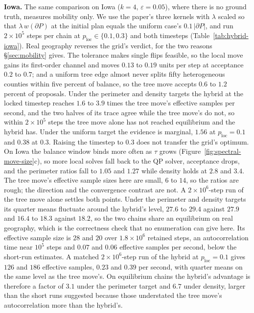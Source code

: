 \documentclass[11pt]{article}
\begin{document}
\textbf{Iowa.} The same comparison on Iowa ($k = 4$,
$\varepsilon = 0.05$), where there is no ground truth, measures
mobility only. We use the paper's three kernels with $\lambda$ scaled
so that $\lambda\,w(\partial P)$ at the initial plan equals the
uniform case's $0.1\,|\partial P|$, and run $2 \times 10^5$ steps per
chain at $p_{\mathrm{loc}} \in \{0.1, 0.3\}$ and both timesteps
(Table~\ref{tab:hybrid-iowa}). Real geography reverses the grid's
verdict, for the two reasons \S\ref{sec:mobility} gives. The
tolerance makes single flips feasible, so the local move gains its
first-order channel and moves $0.13$ to $0.19$ units per step at
acceptance $0.2$ to $0.7$; and a uniform tree edge almost never
splits fifty heterogeneous counties within five percent of balance,
so the tree move accepts $0.6$ to $1.2$ percent of proposals. Under
the perimeter and density targets the hybrid at the locked timestep
reaches $1.6$ to $3.9$ times the tree move's effective samples per
second, and the two halves of its trace agree while the tree move's
do not, so within $2 \times 10^5$ steps the tree move alone has not
reached equilibrium and the hybrid has. Under the uniform target the
evidence is marginal, $1.56$ at $p_{\mathrm{loc}} = 0.1$ and $0.38$
at $0.3$. Raising the timestep to $0.3$ does not transfer the grid's
optimum. On Iowa the balance window binds more often as $\tau$ grows
(Figure~\ref{fig:spectral-move-size}c), so more local solves fall
back to the QP solver, acceptance drops, and the perimeter ratios
fall to $1.05$ and $1.27$ while density holds at $2.8$ and $3.4$. The
tree move's effective sample sizes here are small, $6$ to $14$, so
the ratios are rough; the direction and the convergence contrast are
not. A $2 \times 10^6$-step run of the tree move alone settles both
points. Under the perimeter and density targets its quarter means
fluctuate around the hybrid's level, $27.6$ to $29.4$ against $27.9$
and $16.4$ to $18.3$ against $18.2$, so the two chains share an
equilibrium on real geography, which is the correctness check that
no enumeration can give here. Its effective sample size is $28$ and
$20$ over $1.8 \times 10^6$ retained steps, an autocorrelation time
near $10^5$ steps and $0.07$ and $0.06$ effective samples per second,
below the short-run estimates. A matched $2 \times 10^6$-step run of
the hybrid at $p_{\mathrm{loc}} = 0.1$ gives $126$ and $186$
effective samples, $0.23$ and $0.39$ per second, with quarter means
on the same level as the tree move's. On equilibrium chains the
hybrid's advantage is therefore a factor of $3.1$ under the
perimeter target and $6.7$ under density, larger than the short runs
suggested because those understated the tree move's autocorrelation
more than the hybrid's.
\end{document}
